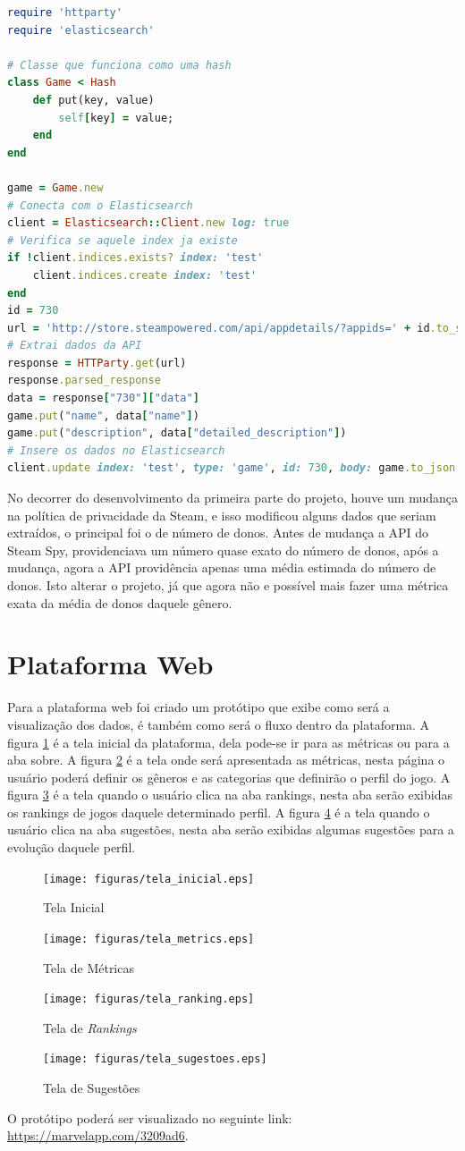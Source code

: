 \begin{lstlisting}[language={Ruby}, caption = {Código do Plugin}, label = {code:plugin}]
require 'httparty'
require 'elasticsearch'

# Classe que funciona como uma hash
class Game < Hash
	def put(key, value)
		self[key] = value;
	end
end

game = Game.new
# Conecta com o Elasticsearch
client = Elasticsearch::Client.new log: true
# Verifica se aquele index ja existe
if !client.indices.exists? index: 'test'
	client.indices.create index: 'test'
end
id = 730
url = 'http://store.steampowered.com/api/appdetails/?appids=' + id.to_s
# Extrai dados da API
response = HTTParty.get(url)
response.parsed_response
data = response["730"]["data"]
game.put("name", data["name"])
game.put("description", data["detailed_description"])
# Insere os dados no Elasticsearch
client.update index: 'test', type: 'game', id: 730, body: game.to_json
\end{lstlisting}
No decorrer do desenvolvimento da primeira parte do projeto, houve um mudança na política de privacidade da Steam, e isso modificou alguns dados que seriam extraídos, o principal foi o de número de donos. Antes de mudança a API do Steam Spy, providenciava um número quase exato do número de donos, após a mudança, agora a API providência apenas uma média estimada do número de donos. Isto alterar o projeto, já que agora não e possível mais fazer uma métrica exata da média de donos daquele gênero.
\section{Plataforma Web}
Para a plataforma web foi criado um protótipo que exibe como será a visualização dos dados, é também como será o fluxo dentro da plataforma. A figura \ref{image:inicial} é a tela inicial da plataforma, dela pode-se ir para as métricas ou para a aba sobre. A figura \ref{image:metrics} é a tela onde será apresentada as métricas, nesta página o usuário poderá definir os gêneros e as categorias que definirão o perfil do jogo. A figura \ref{image:rankings} é a tela quando o usuário clica na aba rankings, nesta aba serão exibidas os rankings de jogos daquele determinado perfil. A figura \ref{image:sugestoes} é a tela quando o usuário clica na aba sugestões, nesta aba serão exibidas algumas sugestões para a evolução daquele perfil.
\begin{figure}
\centering
\texttt{[image: figuras/tela\_inicial.eps]}
\caption{Tela Inicial}
\label{image:inicial}
\end{figure}
\begin{figure}
\centering
\texttt{[image: figuras/tela\_metrics.eps]}
\caption{Tela de Métricas}
\label{image:metrics}
\end{figure}
\begin{figure}
\centering
\texttt{[image: figuras/tela\_ranking.eps]}
\caption{Tela de \textit{Rankings}}
\label{image:rankings}
\end{figure}
\begin{figure}
\centering
\texttt{[image: figuras/tela\_sugestoes.eps]}
\caption{Tela de Sugestões}
\label{image:sugestoes}
\end{figure}
O protótipo poderá ser visualizado no seguinte link: \url{https://marvelapp.com/3209ad6}.